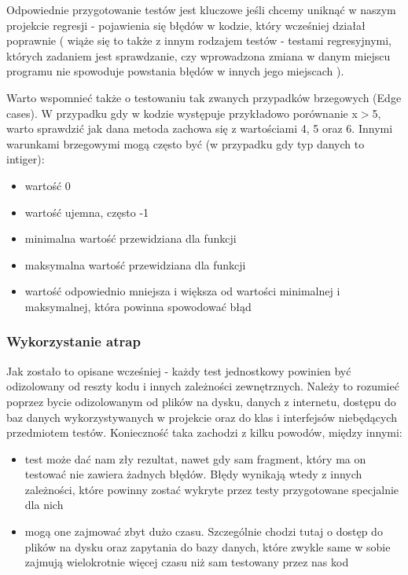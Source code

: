 Odpowiednie przygotowanie testów jest kluczowe jeśli chcemy uniknąć w naszym projekcie regresji - pojawienia się błędów w kodzie, który wcześniej działał poprawnie ( wiąże się to także z innym rodzajem testów - testami regresyjnymi, których zadaniem jest sprawdzanie, czy wprowadzona zmiana w danym miejscu programu nie spowoduje powstania błędów w innych jego miejscach \cite{RegressionTesting}). 

Warto wspomnieć także o testowaniu tak zwanych przypadków brzegowych (Edge cases). W przypadku gdy w kodzie występuje przykładowo porównanie x$>$5, warto sprawdzić jak dana metoda zachowa się z wartościami 4, 5 oraz 6. Innymi warunkami brzegowymi mogą często być (w przypadku gdy typ danych to intiger): 
\begin{itemize}
    \item wartość 0
    \item wartość ujemna, często -1
    \item minimalna wartość przewidziana dla funkcji
    \item maksymalna wartość przewidziana dla funkcji
    \item wartość odpowiednio mniejsza i większa od wartości minimalnej i maksymalnej, która powinna spowodować błąd 
\end{itemize}

\subsubsection{Wykorzystanie atrap}
Jak zostało to opisane wcześniej - każdy test jednostkowy powinien być odizolowany od reszty kodu i innych zależności zewnętrznych. Należy to rozumieć poprzez bycie odizolowanym od plików na dysku, danych z internetu, dostępu do baz danych wykorzystywanych w projekcie oraz do klas i interfejsów niebędących przedmiotem testów. Konieczność taka zachodzi z kilku powodów, między innymi: 
\begin{itemize}
    \item test może dać nam zły rezultat, nawet gdy sam fragment, który ma on testować nie zawiera żadnych błędów. Błędy wynikają wtedy z innych zależności, które powinny zostać wykryte przez testy przygotowane specjalnie dla nich
    \item mogą one zajmować zbyt dużo czasu. Szczególnie chodzi tutaj o dostęp do plików na dysku oraz zapytania do bazy danych, które zwykle same w sobie zajmują wielokrotnie więcej czasu niż sam testowany przez nas kod
\end{itemize}

